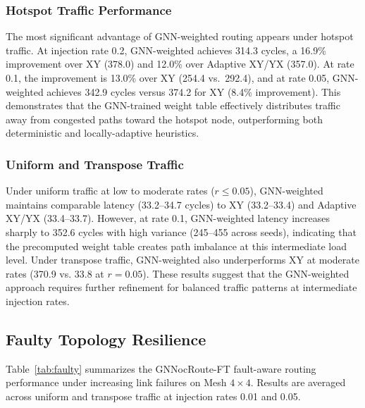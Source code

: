 \subsubsection{Hotspot Traffic Performance}

The most significant advantage of GNN-weighted routing appears under hotspot traffic. At injection rate 0.2, GNN-weighted achieves 314.3 cycles, a 16.9\% improvement over XY (378.0) and 12.0\% over Adaptive XY/YX (357.0). At rate 0.1, the improvement is 13.0\% over XY (254.4 vs.~292.4), and at rate 0.05, GNN-weighted achieves 342.9 cycles versus 374.2 for XY (8.4\% improvement). This demonstrates that the GNN-trained weight table effectively distributes traffic away from congested paths toward the hotspot node, outperforming both deterministic and locally-adaptive heuristics.

\subsubsection{Uniform and Transpose Traffic}

Under uniform traffic at low to moderate rates ($r \leq 0.05$), GNN-weighted maintains comparable latency (33.2--34.7 cycles) to XY (33.2--33.4) and Adaptive XY/YX (33.4--33.7). However, at rate 0.1, GNN-weighted latency increases sharply to 352.6 cycles with high variance (245--455 across seeds), indicating that the precomputed weight table creates path imbalance at this intermediate load level. Under transpose traffic, GNN-weighted also underperforms XY at moderate rates (370.9 vs. 33.8 at $r=0.05$). These results suggest that the GNN-weighted approach requires further refinement for balanced traffic patterns at intermediate injection rates.

\subsection{Faulty Topology Resilience}
\label{sec:faulty-results}

Table~\ref{tab:faulty} summarizes the GNNocRoute-FT fault-aware routing performance under increasing link failures on Mesh $4\times4$. Results are averaged across uniform and transpose traffic at injection rates 0.01 and 0.05.

